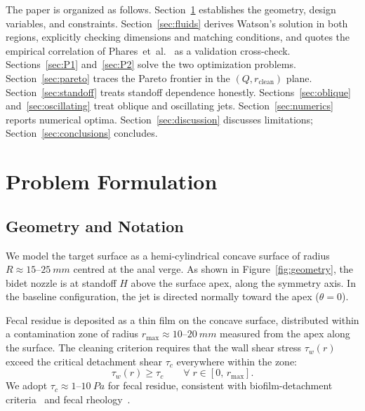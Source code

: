 \documentclass[10pt,letterpaper]{article}
\begin{document}
The paper is organized as follows. Section~\ref{sec:problem} establishes
the geometry, design variables, and constraints. Section~\ref{sec:fluids}
derives Watson's solution in both regions, explicitly checking dimensions
and matching conditions, and quotes the empirical correlation of
Phares~et~al.~\citep{Phares2000} as a validation cross-check.
Sections~\ref{sec:P1} and~\ref{sec:P2} solve the two optimization problems.
Section~\ref{sec:pareto} traces the Pareto frontier in the $(Q, r_\mathrm{clean})$
plane. Section~\ref{sec:standoff} treats standoff dependence honestly.
Sections~\ref{sec:oblique} and~\ref{sec:oscillating} treat oblique and
oscillating jets. Section~\ref{sec:numerics} reports numerical optima.
Section~\ref{sec:discussion} discusses limitations; Section~\ref{sec:conclusions}
concludes.

\section{Problem Formulation}
\label{sec:problem}

\subsection{Geometry and Notation}

We model the target surface as a hemi-cylindrical concave surface of
radius $R \approx 15$--$25~mm$ centred at the anal verge. As shown
in Figure~\ref{fig:geometry}, the bidet nozzle is at standoff $H$ above
the surface apex, along the symmetry axis. In the baseline configuration,
the jet is directed normally toward the apex ($\theta = 0$).

Fecal residue is deposited as a thin film on the concave surface, distributed
within a contamination zone of radius $r_\mathrm{max} \approx 10$--$20~mm$
measured from the apex along the surface. The cleaning criterion requires
that the wall shear stress $\tau_w(r)$ exceed the critical detachment
shear $\tau_c$ everywhere within the zone:
\begin{equation}
  \tau_w(r) \geq \tau_c \qquad \forall\; r \in [0,\,r_\mathrm{max}].
  \label{eq:cleaning}
\end{equation}
We adopt $\tau_c \approx 1$--$10~Pa$ for fecal residue, consistent
with biofilm-detachment criteria~\citep{Ehedg2003} and fecal
rheology~\citep{Woolley2014}.
\end{document}
